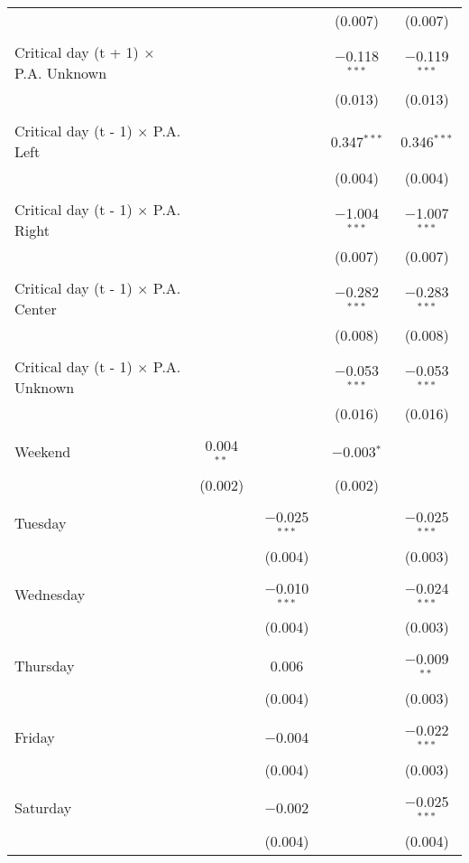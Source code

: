 \documentclass[
]{article}
\begin{document}
\begin{table}[!htbp]
{\begin{tabular}{@{\extracolsep{5pt}}lcccc}
  &  &  & (0.007) & (0.007) \\ 
  & & & & \\ 
 Critical day (t + 1) $\times$ P.A. Unknown &  &  & $-$0.118$^{***}$ & $-$0.119$^{***}$ \\ 
  &  &  & (0.013) & (0.013) \\ 
  & & & & \\ 
 Critical day (t - 1) $\times$ P.A. Left &  &  & 0.347$^{***}$ & 0.346$^{***}$ \\ 
  &  &  & (0.004) & (0.004) \\ 
  & & & & \\ 
 Critical day (t - 1) $\times$ P.A. Right &  &  & $-$1.004$^{***}$ & $-$1.007$^{***}$ \\ 
  &  &  & (0.007) & (0.007) \\ 
  & & & & \\ 
 Critical day (t - 1) $\times$ P.A. Center &  &  & $-$0.282$^{***}$ & $-$0.283$^{***}$ \\ 
  &  &  & (0.008) & (0.008) \\ 
  & & & & \\ 
 Critical day (t - 1) $\times$ P.A. Unknown &  &  & $-$0.053$^{***}$ & $-$0.053$^{***}$ \\ 
  &  &  & (0.016) & (0.016) \\ 
  & & & & \\ 
 Weekend & 0.004$^{**}$ &  & $-$0.003$^{*}$ &  \\ 
  & (0.002) &  & (0.002) &  \\ 
  & & & & \\ 
 Tuesday &  & $-$0.025$^{***}$ &  & $-$0.025$^{***}$ \\ 
  &  & (0.004) &  & (0.003) \\ 
  & & & & \\ 
 Wednesday &  & $-$0.010$^{***}$ &  & $-$0.024$^{***}$ \\ 
  &  & (0.004) &  & (0.003) \\ 
  & & & & \\ 
 Thursday &  & 0.006 &  & $-$0.009$^{**}$ \\ 
  &  & (0.004) &  & (0.003) \\ 
  & & & & \\ 
 Friday &  & $-$0.004 &  & $-$0.022$^{***}$ \\ 
  &  & (0.004) &  & (0.003) \\ 
  & & & & \\ 
 Saturday &  & $-$0.002 &  & $-$0.025$^{***}$ \\ 
  &  & (0.004) &  & (0.004) \\ 

\end{tabular}}
\end{table}
\end{document}
